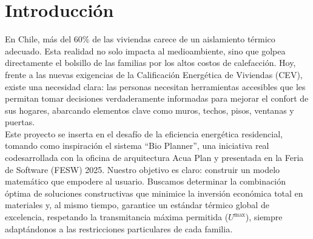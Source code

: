 \section{Introducci\'on}

En Chile, más del 60\% de las viviendas carece de un aislamiento térmico adecuado. Esta realidad no solo impacta al medioambiente, sino que golpea directamente el bolsillo de las familias por los altos costos de calefacción. Hoy, frente a las nuevas exigencias de la Calificación Energética de Viviendas (CEV), existe una necesidad clara: las personas necesitan herramientas accesibles que les permitan tomar decisiones verdaderamente informadas para mejorar el confort de sus hogares, abarcando elementos clave como muros, techos, pisos, ventanas y puertas.\\

Este proyecto se inserta en el desafío de la eficiencia energética residencial, tomando como inspiración el sistema ``Bio Planner'', una iniciativa real codesarrollada con la oficina de arquitectura Acua Plan y presentada en la Feria de Software (FESW) 2025. Nuestro objetivo es claro: construir un modelo matemático que empodere al usuario. Buscamos determinar la combinación óptima de soluciones constructivas que minimice la inversión económica total en materiales y, al mismo tiempo, garantice un estándar térmico global de excelencia, respetando la transmitancia máxima permitida ($U^{\text{max}}$), siempre adaptándonos a las restricciones particulares de cada familia.\\

